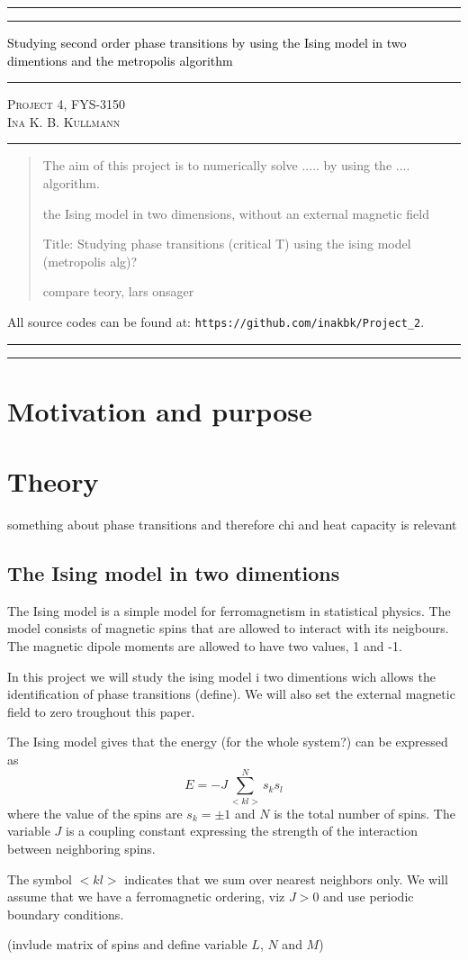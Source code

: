 \documentclass[11pt,a4wide]{article}
\newcommand*{\titleAT}{\begingroup %
\newlength{\drop} %
\drop=0.1\textheight %

\rule{\textwidth}{1pt}\par %
\vspace{2pt}\vspace{-\baselineskip} %
\rule{\textwidth}{0.4pt}\par %

\vspace{0.5\drop} %
\centering %
\textcolor{black}{ %
{\Huge Studying second order phase transitions by using the Ising model in two dimentions and the metropolis algorithm}\\[0.75\baselineskip] %
} 

\vspace{0.25\drop} %
\rule{0.3\textwidth}{0.4pt}\par %
\vspace{0.25\drop} %

{\Large \textsc{Project 4, FYS-3150\\[0.75\baselineskip] \normalsize{Ina K. B. Kullmann}
}}\par %


\vspace{0.25\drop} %
\rule{0.3\textwidth}{0.4pt}\par %
\vspace{0.25\drop} %

\begin{abstract}
The aim of this project is to numerically solve ..... by using the .... algorithm. 


the Ising model in two dimensions, without an external magnetic 
field

Title: Studying phase transitions (critical T) using the ising model (metropolis alg)?

compare teory, lars onsager





\end{abstract}
\vspace*{0.25\drop} %

\begin{center}
{ \scriptsize \noindent All source codes can be found at: \texttt{https://github.com/inakbk/Project\_2}. }
\end{center}

\rule{\textwidth}{0.4pt}\par %
\vspace{2pt}\vspace{-\baselineskip} %
\rule{\textwidth}{1pt}\par %

\endgroup}
\begin{document}
\titleAT %


\newpage
\tableofcontents
\newpage

\section{Motivation and purpose}


\section{Theory}
something about phase transitions and therefore chi and heat capacity is relevant


\subsection{The Ising model in two dimentions}

The Ising model is a simple model for ferromagnetism in statistical physics. The model consists of magnetic spins that are allowed to interact with its neigbours. The magnetic dipole moments are allowed to have two values, 1 and -1.

In this project we will study the ising model i two dimentions wich allows the identification of phase transitions (define). We will also set the external magnetic field to zero troughout this paper.



The Ising model gives that the energy (for the whole system?) can be expressed as
\begin{equation}
  E=-J\sum_{<kl>}^{N}s_ks_l
\end{equation}
where the value of the spins are  $s_k=\pm 1$ and $N$ is the total number of spins. The variable $J$ is a coupling constant expressing the strength of the interaction between neighboring spins.

The symbol $<kl>$ indicates that we sum over nearest neighbors only. We will assume that we have a ferromagnetic ordering, viz $J> 0$ and use periodic boundary conditions. 

(invlude matrix of spins and define variable $L$, $N$ and $M$)
\end{document}
